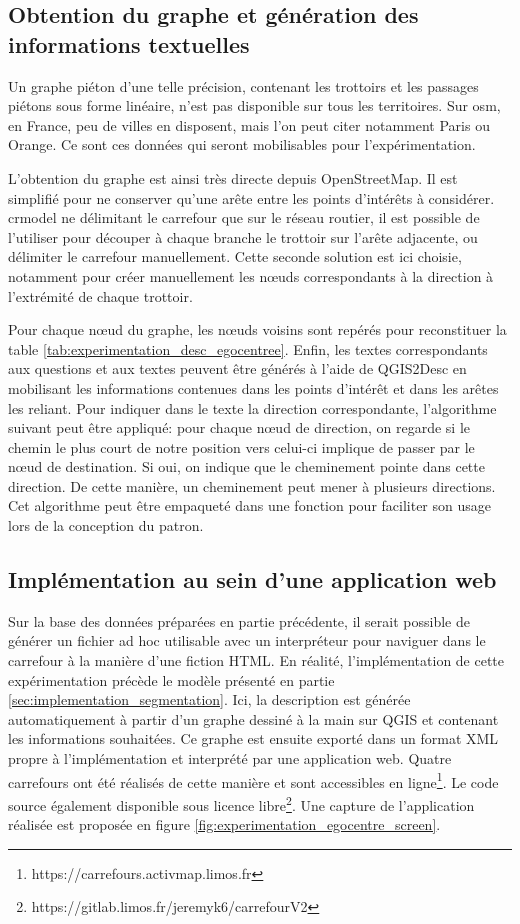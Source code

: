 \subsection{Obtention du graphe et génération des informations textuelles}

Un graphe piéton d'une telle précision, contenant les trottoirs et les passages piétons sous forme linéaire, n'est pas disponible sur tous les territoires. Sur \gls{osm}, en France, peu de villes en disposent, mais l'on peut citer notamment Paris ou Orange. Ce sont ces données qui seront mobilisables pour l'expérimentation. 

\newpar{}

L'obtention du graphe est ainsi très directe depuis OpenStreetMap. Il est simplifié pour ne conserver qu'une arête entre les points d'intérêts à considérer. crmodel ne délimitant le carrefour que sur le réseau routier, il est possible de l'utiliser pour découper à chaque branche le trottoir sur l'arête adjacente, ou délimiter le carrefour manuellement. Cette seconde solution est ici choisie, notamment pour créer manuellement les nœuds correspondants à la direction à l'extrémité de chaque trottoir.

\newpar{}

Pour chaque nœud du graphe, les nœuds voisins sont repérés pour reconstituer la table \ref{tab:experimentation_desc_egocentree}. Enfin, les textes correspondants aux questions et aux textes peuvent être générés à l'aide de QGIS2Desc en mobilisant les informations contenues dans les points d'intérêt et dans les arêtes les reliant. Pour indiquer dans le texte la direction correspondante, l'algorithme suivant peut être appliqué: pour chaque nœud de direction, on regarde si le chemin le plus court de notre position vers celui-ci implique de passer par le nœud de destination. Si oui, on indique que le cheminement pointe dans cette direction. De cette manière, un cheminement peut mener à plusieurs directions. Cet algorithme peut être empaqueté dans une fonction pour faciliter son usage lors de la conception du patron.

\subsection{Implémentation au sein d'une application web}

Sur la base des données préparées en partie précédente, il serait possible de générer un fichier ad hoc utilisable avec un interpréteur pour naviguer dans le carrefour à la manière d'une fiction HTML. En réalité, l'implémentation de cette expérimentation précède le modèle présenté en partie \ref{sec:implementation_segmentation}. Ici, la description est générée automatiquement à partir d'un graphe dessiné à la main sur QGIS et contenant les informations souhaitées. Ce graphe est ensuite exporté dans un format XML propre à l'implémentation et interprété par une application web. Quatre carrefours ont été réalisés de cette manière et sont accessibles en ligne\footnote{https://carrefours.activmap.limos.fr}. Le code source également disponible sous licence libre\footnote{https://gitlab.limos.fr/jeremyk6/carrefourV2}. Une capture de l'application réalisée est proposée en figure \ref{fig:experimentation_egocentre_screen}.

